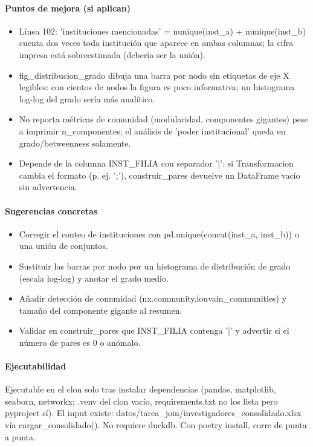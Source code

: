 \paragraph{Puntos de mejora (si aplican)}
\begin{itemize}
  \item Línea 102: 'instituciones mencionadas' = nunique(inst\_a) + nunique(inst\_b) cuenta dos veces toda institución que aparece en ambas columnas; la cifra impresa está sobreestimada (debería ser la unión).
  \item fig\_distribucion\_grado dibuja una barra por nodo sin etiquetas de eje X legibles: con cientos de nodos la figura es poco informativa; un histograma log-log del grado sería más analítico.
  \item No reporta métricas de comunidad (modularidad, componentes gigantes) pese a imprimir n\_componentes; el análisis de 'poder institucional' queda en grado/betweenness solamente.
  \item Depende de la columna INST\_FILIA con separador '|': si Transformacion cambia el formato (p. ej. ';'), construir\_pares devuelve un DataFrame vacío sin advertencia.
\end{itemize}

\paragraph{Sugerencias concretas}
\begin{itemize}
  \item Corregir el conteo de instituciones con pd.unique(concat(inst\_a, inst\_b)) o una unión de conjuntos.
  \item Sustituir las barras por nodo por un histograma de distribución de grado (escala log-log) y anotar el grado medio.
  \item Añadir detección de comunidad (nx.community.louvain\_communities) y tamaño del componente gigante al resumen.
  \item Validar en construir\_pares que INST\_FILIA contenga '|' y advertir si el número de pares es 0 o anómalo.
\end{itemize}

\paragraph{Ejecutabilidad}
Ejecutable en el clon solo tras instalar dependencias (pandas, matplotlib, seaborn, networkx; .venv del clon vacío, requirements.txt no los lista pero pyproject sí). El input existe: datos/tarea\_join/investigadores\_consolidado.xlsx vía cargar\_consolidado(). No requiere duckdb. Con poetry install, corre de punta a punta.

